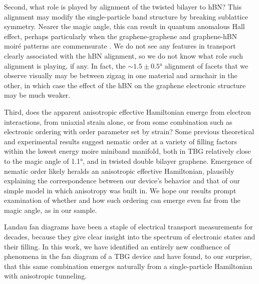 \documentclass[12pt,twocolumn]{article}
\begin{document}
Second, what role is played by alignment of the twisted bilayer to hBN? This alignment may modify the single-particle band structure by breaking sublattice symmetry. Nearer the magic angle, this can result in quantum anomalous Hall effect, perhaps particularly when the graphene-graphene and graphene-hBN moiré patterns are commensurate \cite{shiMoirCommensurabilityQuantum2021}. We do not see any features in transport clearly associated with the hBN alignment, so we do not know what role such alignment is playing, if any. In fact, the $\sim 1.5\pm 0.5$° alignment of facets that we observe visually may be between zigzag in one material and armchair in the other, in which case the effect of the hBN on the graphene electronic structure may be much weaker.

Third, does the apparent anisotropic effective Hamiltonian emerge from electron interactions, from uniaxial strain alone, or from some combination such as electronic ordering with order parameter set by strain? Some previous theoretical \cite{chichinadzeNematicSuperconductivityTwisted2020,fernandesNematicityTwistRotational2020,kangNonAbelianDiracNode2020,liuNematicTopologicalSemimetal2021,samajdarElectricfieldtunableElectronicNematic2021,parkerStraininducedQuantumPhase2020} and experimental \cite{choiElectronicCorrelationsTwisted2019,jiangChargeOrderBroken2019,kerelskyMaximizedElectronInteractions2019,rubio-verduUniversalMoirNematic2020} results suggest nematic order at a variety of filling factors within the lowest energy moire miniband manifold, both in TBG relatively close to the magic angle of 1.1°, and in twisted double bilayer graphene. Emergence of nematic order likely heralds an anisotropic effective Hamiltonian, plausibly explaining the correspondence between our device’s behavior and that of our simple model in which anisotropy was built in. We hope our results prompt examination of whether and how such ordering can emerge even far from the magic angle, as in our sample. 

Landau fan diagrams have been a staple of electrical transport measurements for decades, because they give clear insight into the spectrum of electronic states and their filling. In this work, we have identified an entirely new confluence of phenomena in the fan diagram of a TBG device and have found, to our surprise, that this same combination emerges naturally from a single-particle Hamiltonian with anisotropic tunneling.

\setlength\bibitemsep{0pt}
\printbibliography
\end{document}
